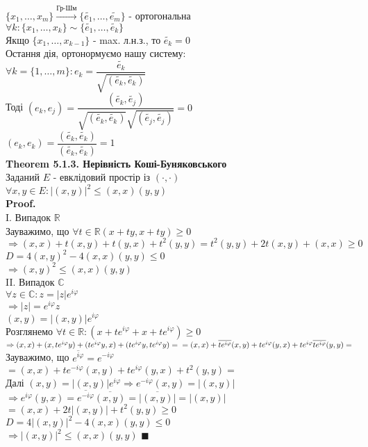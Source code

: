 \documentclass[a4paper, 14pt]{extarticle}
\def\th#1{\textbf{Theorem {#1}}}
\def\proof{\textbf{Proof.}\\}
\def\bigline{\vspace{5mm}\\}
\def\qed{$\blacksquare$}
\begin{document}
$\{x_1,\dots,x_m\} \overset{\textrm{Гр-Шм}}{\rightarrow} \{\tilde{e_1},\dots,\tilde{e_m}\}$ - ортогональна\\
$\forall k: \{x_1,\dots,x_k\} \sim \{\tilde{e_1},\dots, \tilde{e_k}\}$\\
Якщо $\{x_1,\dots,x_{k-1}\}$ - max. л.н.з., то $\tilde{e_k} = 0$
\bigline
Остання дія, ортонормуємо нашу систему:\\
$\forall k = \{1,\dots,m\}: e_k = \dfrac{\tilde{e_k}}{\sqrt{(\tilde{e_k},\tilde{e_k})}}$\\
Тоді $(e_k,e_j) = \dfrac{(\tilde{e_k},\tilde{e_j})}{\sqrt{(\tilde{e_k},\tilde{e_k})} \sqrt{(\tilde{e_j},\tilde{e_j})}} = 0$\\
$(e_k,e_k) = \dfrac{(\tilde{e_k},\tilde{e_k})}{(\tilde{e_k},\tilde{e_k})} = 1$
\bigline
\th{5.1.3. Нерівність Коші-Буняковського}\\
Заданий $E$ - евклідовий простір із $(\cdot, \cdot)$\\
$\forall x,y \in E: |(x,y)|^2 \leq (x,x)(y,y)$\\
\proof
I. Випадок $\mathbb{R}$\\
Зауважимо, що $\forall t \in \mathbb{R} (x+ty, x+ty) \geq 0$\\
$\Rightarrow (x,x) + t(x,y) + t(y,x) + t^2(y,y) = t^2(y,y) + 2t(x,y) + (x,x) \geq 0$\\
$D = 4(x,y)^2 - 4(x,x)(y,y) \leq 0$\\
$\Rightarrow (x,y)^2 \leq (x,x)(y,y)$
\bigline
II. Випадок $\mathbb{C}$\\
$\forall z \in \mathbb{C}: z = |z|e^{i \varphi}$\\
$\Rightarrow |z| = e^{i \varphi} z$\\
$(x,y) = |(x,y)|e^{i \varphi}$\\
Розглянемо $\forall t \in \mathbb{R}: (x+te^{i\varphi} + x + t e^{i\varphi}) \geq 0$\\
$\Rightarrow (x,x)+(x,te^{i\varphi}y) + (te^{i\varphi}y,x)+(te^{i\varphi}y, te^{i\varphi}y) =\\
= (x,x) + \overline{t e^{i\varphi}}(x,y) + te^{i \varphi} (y,x) + te^{i \varphi} \overline{t e^{i\varphi}} (y,y) = \\ $
Зауважимо, що $\overline{e^{i\varphi}} = e^{-i\varphi}$\\
$= (x,x) + te^{-i\varphi}(x,y) + te^{i\varphi}(y,x) + t^2(y,y) =$\\
Далі $(x,y) = |(x,y)|e^{i \varphi} \Rightarrow e^{-i \varphi}(x,y) = |(x,y)|$\\
$\Rightarrow e^{i\varphi}(y,x) = \overline{e^{-i\varphi}} \overline{(x,y)} = \overline{|(x,y)|} = |(x,y)|$\\
$= (x,x) + 2t|(x,y)| + t^2(y,y) \geq 0$\\
$D = 4|(x,y)|^2 - 4(x,x)(y,y) \leq 0$\\
$\Rightarrow |(x,y)|^2 \leq (x,x)(y,y)$ \qed
\bigline
\end{document}
